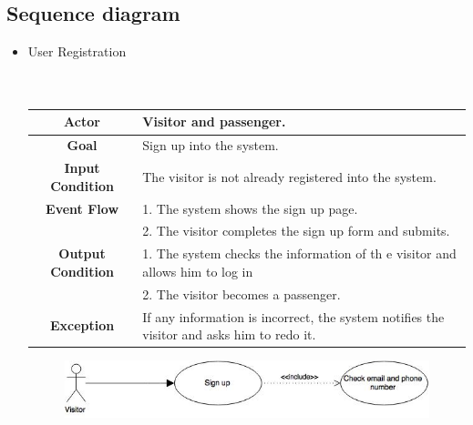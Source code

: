 \documentclass[18pt,oneside,a4paper, titlepage]{article}
\begin{document}
	\subsection{Sequence diagram}
	\begin{itemize}
		\item User Registration
		\\ \\ \\
		\begin{center}
			\centering
			
			\begin{tabular}{| c| p{8cm}|}
				\hline \textbf{Actor} &  Visitor and passenger.\\
				\hline \textbf{Goal} & Sign up into the system.\\
				\hline \textbf{Input Condition} & The visitor is not already registered into the system. \\
				\hline \textbf{Event Flow} & 1.	The system shows the sign up page.\\
				& 2. The visitor completes the sign up form and submits.	\\
				\hline \textbf{Output Condition} & 1. The system checks the information  of th e visitor and allows him to log in\\
				& 2. The visitor becomes a passenger.\\
				\hline \textbf{Exception} & If any information is incorrect, the system notifies the visitor and asks him to redo it.\\
				\hline
			\end{tabular}
			\vspace{4cm}
			\begin{figure}[h]
				\includegraphics[scale=0.71]{UseCaseSignup.jpg}
			\end{figure}
		\end{center}
		
		\newpage
		

\end{itemize}
\end{document}
